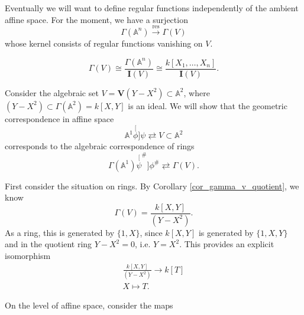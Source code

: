 \documentclass[12pt]{article}
\begin{document}
Eventually we will want to define regular functions independently of the ambient affine space. For the moment, we have a surjection 
\begin{equation*}
	\Gamma(\mathbb{A}^n) \overset{\text{res}}{\longrightarrow} \Gamma(V)
\end{equation*}
whose kernel consists of regular functions vanishing on $V$. 

\begin{corollary}
\label{cor_gamma_v_quotient}
	\begin{equation*}
		\Gamma(V) \cong \frac{\Gamma(\mathbb{A}^n)}{\mathbf{I}(V)} \cong \frac{k[X_1,\dots, X_n]}{\mathbf{I}(V)}.
	\end{equation*}
\end{corollary}

\begin{example}
	Consider the algebraic set $V = \mathbf{V}(Y-X^2)\subset\mathbb{A}^2$, where $(Y-X^2)\subset \Gamma(\mathbb{A}^2)=k[X,Y]$ is an ideal. We will show that the geometric correspondence in affine space 
	\begin{equation*}
		\mathbb{A}^1 \stackrel[\phi]{\psi}{\rightleftarrows} V\subset\mathbb{A}^2
	\end{equation*}
	corresponds to the algebraic correspondence of rings 
	\begin{equation*}
		\Gamma(\mathbb{A}^1) \stackrel[\psi^\#]{\phi^\#}{\rightleftarrows} \Gamma(V).
	\end{equation*}

	First consider the situation on rings. By Corollary \ref{cor_gamma_v_quotient}, we know 
	\begin{equation*}
		\Gamma(V) = \frac{k[X,Y]}{(Y-X^2)}.
	\end{equation*}
	As a ring, this is generated by $\{1, X\}$, since $k[X,Y]$ is generated by $\{1,X,Y\}$ and in the quotient ring $Y-X^2=0$, i.e. $Y=X^2$. This provides an explicit isomorphism 
	\begin{gather*}
		\frac{k[X,Y]}{(Y-X^2)} \to k[T] \\
		X \mapsto T.
	\end{gather*}

	On the level of affine space, consider the maps 

	\begin{centering}
\end{centering}
\end{example}
\end{document}
